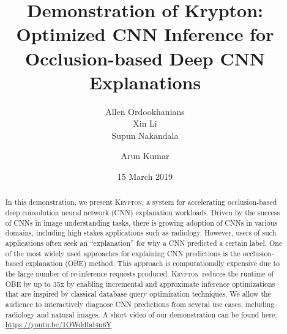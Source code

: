 \documentclass{vldb}
\newcommand{\system}{\textsc{Krypton}}
\begin{document}
\title{Demonstration of Krypton: Optimized CNN Inference for Occlusion-based Deep CNN Explanations}


\author{
\alignauthor Allen Ordookhanians\\
\alignauthor Xin Li\\
\alignauthor Supun Nakandala\\
\and
\alignauthor Arun Kumar\\
}

\date{15 March 2019}


\maketitle

\begin{abstract}
In this demonstration, we present \system, a system for accelerating occlusion-based deep convolution neural network (CNN) explanation workloads.
Driven by the success of CNNs in image understanding tasks, there is growing adoption of CNNs in various domains, including high stakes applications such as radiology.
However, users of such applications often seek an ``explanation'' for why a CNN predicted a certain label.
One of the most widely used approaches for explaining CNN predictions is the occlusion-based explanation (OBE) method.
This approach is computationally expensive due to the large number of re-inference requests produced.
\system~reduces the runtime of OBE by up to 35x by enabling incremental and approximate inference optimizations that are inspired by classical database query optimization techniques.
We allow the audience to interactively diagnose CNN predictions from several use cases, including radiology and natural images.
A short video of our demonstration can be found here: \url{https://youtu.be/1OWddbd4n6Y}
\end{abstract}
\end{document}
